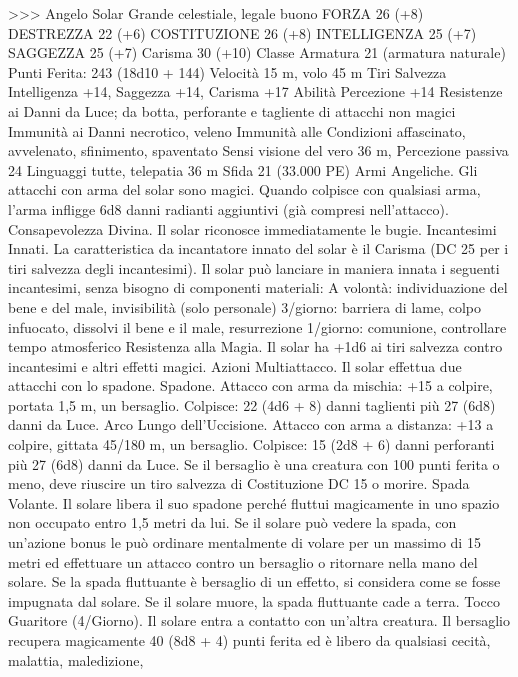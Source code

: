 \begin{multicols}{2}
>>>
Angelo Solar
Grande celestiale, legale buono
FORZA 26 (+8)
DESTREZZA 22 (+6)
COSTITUZIONE 26 (+8)
INTELLIGENZA 25 (+7)
SAGGEZZA 25 (+7)
Carisma 30 (+10)
Classe Armatura 21 (armatura naturale)
\hspace*{0pt}\hfill{Punti Ferita}: 243 (18d10 + 144)
Velocità 15 m, volo 45 m
Tiri Salvezza Intelligenza +14, Saggezza +14, Carisma +17
Abilità Percezione +14
Resistenze ai Danni da Luce; da botta, perforante e tagliente
di attacchi non magici
Immunità ai Danni necrotico, veleno
Immunità alle Condizioni affascinato, avvelenato, sfinimento,
spaventato
Sensi visione del vero 36 m, Percezione passiva 24
Linguaggi tutte, telepatia 36 m
Sfida 21 (33.000 PE)
Armi Angeliche. Gli attacchi con arma del solar sono magici.
Quando colpisce con qualsiasi arma, l’arma infligge 6d8 danni
radianti aggiuntivi (già compresi nell’attacco).
Consapevolezza Divina. Il solar riconosce immediatamente le
bugie.
Incantesimi Innati. La caratteristica da incantatore innato del
solar è il Carisma (DC 25 per i tiri salvezza degli incantesimi). Il
solar può lanciare in maniera innata i seguenti incantesimi, senza
bisogno di componenti materiali:
A volontà: individuazione del bene e del male, invisibilità (solo
personale)
3/giorno: barriera di lame, colpo infuocato, dissolvi il bene e il
male, resurrezione
1/giorno: comunione, controllare tempo atmosferico
Resistenza alla Magia. Il solar ha +1d6 ai tiri salvezza
contro incantesimi e altri effetti magici.
Azioni
Multiattacco. Il solar effettua due attacchi con lo spadone.
Spadone. Attacco con arma da mischia: +15 a colpire, portata
1,5 m, un bersaglio.
Colpisce: 22 (4d6 + 8) danni taglienti più 27 (6d8) danni da Luce.
Arco Lungo dell’Uccisione. Attacco con arma a distanza: +13 a
colpire, gittata 45/180 m, un bersaglio.
Colpisce: 15 (2d8 + 6) danni perforanti più 27 (6d8) danni da Luce.
Se il bersaglio è una creatura con 100 punti ferita o meno, deve
riuscire un tiro salvezza di Costituzione DC 15 o morire.
Spada Volante. Il solare libera il suo spadone perché fluttui
magicamente in uno spazio non occupato entro 1,5 metri da lui.
Se il solare può vedere la spada, con un’azione bonus le può
ordinare mentalmente di volare per un massimo di 15 metri ed
effettuare un attacco contro un bersaglio o ritornare nella mano
del solare. Se la spada fluttuante è bersaglio di un effetto, si
considera come se fosse impugnata dal solare. Se il solare muore,
la spada fluttuante cade a terra.
Tocco Guaritore (4/Giorno). Il solare entra a contatto con
un’altra creatura. Il bersaglio recupera magicamente 40 (8d8 + 4)
punti ferita ed è libero da qualsiasi cecità, malattia, maledizione,

\end{multicols}
